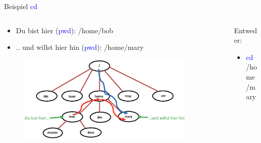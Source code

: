 \documentclass[t, xcolor=dvipsnames]{beamer}
\begin{document}
\begin{frame}{Beispiel \textcolor{blue}{cd}}
    \begin{columns}
        \begin{column}{0.5\textwidth}
            
            \begin{itemize}
                \item \textcolor{ForestGreen!70!Black}{Du bist hier (\textcolor{blue}{pwd}):} /home/bob
                \item \textcolor{ForestGreen!70!Black}{.. und willst hier hin (\textcolor{blue}{pwd})}: /home/mary
            \end{itemize}
            \begin{figure}
	        \centering
	        \includegraphics[width=0.9\textwidth]{graphics/dateipfad}
	\end{figure}
        \end{column}
        \begin{column}{0.5\textwidth}
        
            Entweder:
            \begin{itemize}
                \item \textcolor{blue}{cd} \textcolor{RoyalBlue!80}{/home/mary}
            \end{itemize}
           

\end{column}
\end{columns}
\end{frame}
\end{document}
